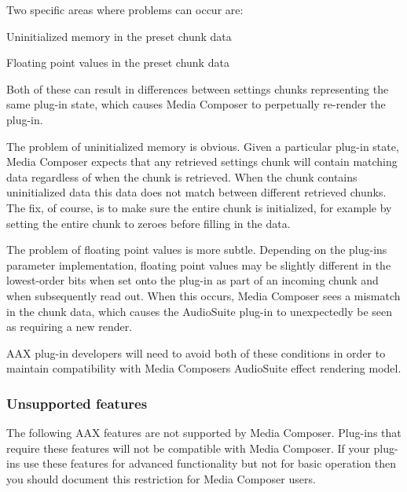 Two specific areas where problems can occur are\+:


\begin{DoxyItemize}
\item Uninitialized memory in the preset chunk data
\item Floating point values in the preset chunk data
\end{DoxyItemize}

Both of these can result in differences between settings chunks representing the same plug-\/in state, which causes Media Composer to perpetually re-\/render the plug-\/in.

The problem of uninitialized memory is obvious. Given a particular plug-\/in state, Media Composer expects that any retrieved settings chunk will contain matching data regardless of when the chunk is retrieved. When the chunk contains uninitialized data this data does not match between different retrieved chunks. The fix, of course, is to make sure the entire chunk is initialized, for example by setting the entire chunk to zeroes before filling in the data.

The problem of floating point values is more subtle. Depending on the plug-\/in\textquotesingle{}s parameter implementation, floating point values may be slightly different in the lowest-\/order bits when set onto the plug-\/in as part of an incoming chunk and when subsequently read out. When this occurs, Media Composer sees a mismatch in the chunk data, which causes the Audio\+Suite plug-\/in to unexpectedly be seen as requiring a new render.

A\+AX plug-\/in developers will need to avoid both of these conditions in order to maintain compatibility with Media Composer\textquotesingle{}s Audio\+Suite effect rendering model.

\hypertarget{a00831_subsection__aax_media_composer_guide__features__unsupported}{}\subsubsection{Unsupported features}\label{a00831_subsection__aax_media_composer_guide__features__unsupported}
 The following A\+AX features are not supported by Media Composer. Plug-\/ins that require these features will not be compatible with Media Composer. If your plug-\/ins use these features for advanced functionality but not for basic operation then you should document this restriction for Media Composer users.


